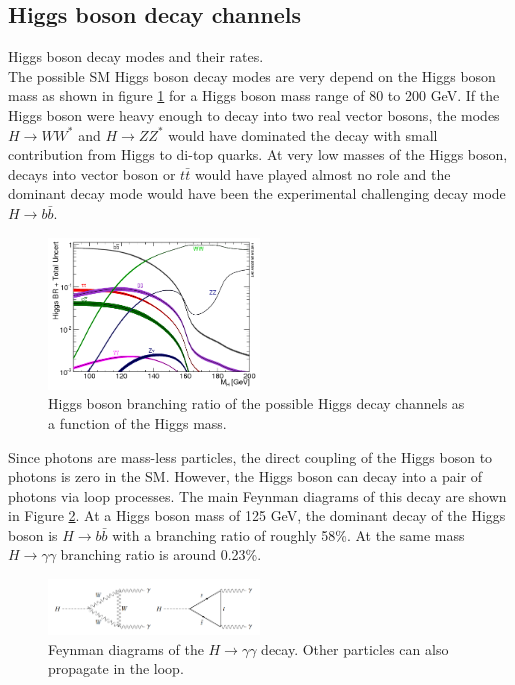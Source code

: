 \subsection{Higgs boson decay channels}
\label{chap1:EWSB:HD}
Higgs boson decay modes and their rates. \\

The possible SM Higgs boson decay modes are very depend on the Higgs boson mass as shown in figure \ref{fig:chap1:EWSB:BR} for a Higgs boson mass range of 80 to 200 GeV. If the Higgs boson were heavy enough to decay into two real vector bosons, the modes $H\rightarrow WW^*$ and $ H\rightarrow ZZ^*$ would have dominated the decay with small contribution from Higgs to di-top quarks. At very low masses of the Higgs boson, decays into vector boson or $t\bar{t}$ would have played almost no role and the dominant decay mode would have been the experimental challenging decay mode $H\rightarrow b\bar{b}$.
\begin{figure}[h!]
    \centering
    \includegraphics[width=0.5\textwidth]{Ch1/Img/Higgs_Br.png}
    \caption{Higgs boson branching ratio of the possible Higgs decay channels as a function of the Higgs mass.}
    \label{fig:chap1:EWSB:BR}
\end{figure}
Since photons are mass-less particles, the direct coupling of the Higgs boson to photons is zero in the SM. However, the Higgs boson can decay into a pair of photons via loop processes. The main Feynman diagrams of this decay are shown in Figure \ref{fig:chap1:EWSB:Hgg}. 
At a Higgs boson mass of 125 GeV, the dominant decay of the Higgs boson is $H \rightarrow b\bar{b}$ with a branching ratio of roughly 58\%. At the same mass $H\rightarrow\gamma\gamma$ branching ratio is around 0.23\%.
\begin{figure}[ht]
    \centering
    \includegraphics[width=0.5\textwidth]{Ch1/Img/H_to_gammagamma.png}
    \caption{Feynman diagrams of the $H\rightarrow\gamma\gamma$ decay. Other particles can also propagate in the loop.}
    \label{fig:chap1:EWSB:Hgg}
\end{figure}

